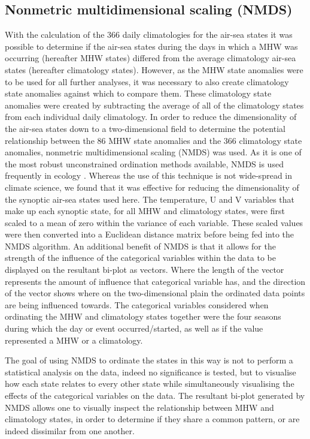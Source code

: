\documentclass[a4paper,10pt,review]{elsarticle}
\begin{document}
\subsection{Nonmetric multidimensional scaling (NMDS)}
With the calculation of the 366 daily climatologies for the air-sea states it was possible to determine if the air-sea states during the days in which a MHW was occurring (hereafter MHW states) differed from the average climatology air-sea states (hereafter climatology states). However, as the MHW state anomalies were to be used for all further analyses, it was necessary to also create climatology state anomalies against which to compare them. These climatology state anomalies were created by subtracting the average of all of the climatology states from each individual daily climatology. In order to reduce the dimensionality of the air-sea states down to a two-dimensional field to determine the potential relationship between the 86 MHW state anomalies and the 366 climatology state anomalies, nonmetric multidimensional scaling (NMDS) was used. As it is one of the most robust unconstrained ordination methods available, NMDS is used frequently in ecology \citep{Minchin1987}. Whereas the use of this technique is not wide-spread in climate science, we found that it was effective for reducing the dimensionality of the synoptic air-sea states used here. The temperature, U and V variables that make up each synoptic state, for all MHW and climatology states, were first scaled to a mean of zero within the variance of each variable. These scaled values were then converted into a Euclidean distance matrix before being fed into the NMDS algorithm. An additional benefit of NMDS is that it allows for the strength of the influence of the categorical variables within the data to be displayed on the resultant bi-plot as vectors. Where the length of the vector represents the amount of influence that categorical variable has, and the direction of the vector shows where on the two-dimensional plain the ordinated data points are being influenced towards. The categorical variables considered when ordinating the MHW and climatology states together were the four seasons during which the day or event occurred/started, as well as if the value represented a MHW or a climatology.

The goal of using NMDS to ordinate the states in this way is not to perform a statistical analysis on the data, indeed no significance is tested, but to visualise how each state relates to every other state while simultaneously visualising the effects of the categorical variables on the data. The resultant bi-plot generated by NMDS allows one to visually inspect the relationship between MHW and climatology states, in order to determine if they share a common pattern, or are indeed dissimilar from one another.
\end{document}
